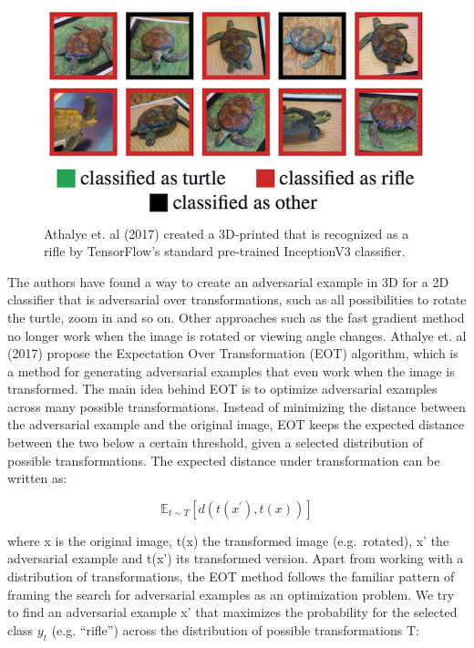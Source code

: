 \documentclass[12pt,]{krantz}
\begin{document}
\begin{figure}

{\centering \includegraphics[width=\textwidth]{images/adversarial-turtle} 

}

\caption{Athalye et. al (2017) created a 3D-printed that is recognized as a rifle by TensorFlow’s standard pre-trained InceptionV3 classifier.}\label{fig:adversarial-turtle}
\end{figure}

The authors have found a way to create an adversarial example in 3D for
a 2D classifier that is adversarial over transformations, such as all
possibilities to rotate the turtle, zoom in and so on. Other approaches
such as the fast gradient method no longer work when the image is
rotated or viewing angle changes. Athalye et. al (2017) propose the
Expectation Over Transformation (EOT) algorithm, which is a method for
generating adversarial examples that even work when the image is
transformed. The main idea behind EOT is to optimize adversarial
examples across many possible transformations. Instead of minimizing the
distance between the adversarial example and the original image, EOT
keeps the expected distance between the two below a certain threshold,
given a selected distribution of possible transformations. The expected
distance under transformation can be written as:

\[\mathbb{E}_{t\sim{}T}[d(t(x^\prime),t(x))]\]

where x is the original image, t(x) the transformed image
(e.g.~rotated), x' the adversarial example and t(x') its transformed
version. Apart from working with a distribution of transformations, the
EOT method follows the familiar pattern of framing the search for
adversarial examples as an optimization problem. We try to find an
adversarial example x' that maximizes the probability for the selected
class \(y_t\) (e.g. ``rifle'') across the distribution of possible
transformations T:
\end{document}
